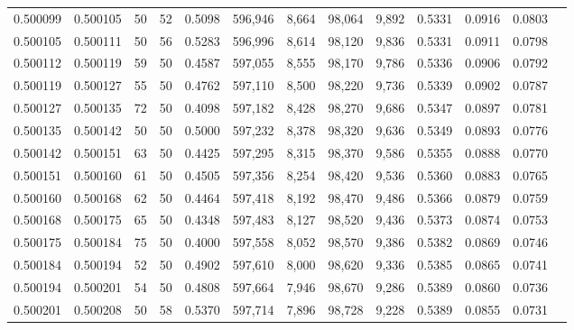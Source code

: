 \begin{tabular}{rrrrrrrrrrrrr}
0.500099 & 0.500105 &    50 &  52 &                                     0.5098 & 596,946 &   8,664 &  98,064 &   9,892 & 0.5331 & 0.0916 & 0.0803 \\
0.500105 & 0.500111 &    50 &  56 &                                     0.5283 & 596,996 &   8,614 &  98,120 &   9,836 & 0.5331 & 0.0911 & 0.0798 \\
0.500112 & 0.500119 &    59 &  50 &                                     0.4587 & 597,055 &   8,555 &  98,170 &   9,786 & 0.5336 & 0.0906 & 0.0792 \\
0.500119 & 0.500127 &    55 &  50 &                                     0.4762 & 597,110 &   8,500 &  98,220 &   9,736 & 0.5339 & 0.0902 & 0.0787 \\
0.500127 & 0.500135 &    72 &  50 &                                     0.4098 & 597,182 &   8,428 &  98,270 &   9,686 & 0.5347 & 0.0897 & 0.0781 \\
0.500135 & 0.500142 &    50 &  50 &                                     0.5000 & 597,232 &   8,378 &  98,320 &   9,636 & 0.5349 & 0.0893 & 0.0776 \\
0.500142 & 0.500151 &    63 &  50 &                                     0.4425 & 597,295 &   8,315 &  98,370 &   9,586 & 0.5355 & 0.0888 & 0.0770 \\
0.500151 & 0.500160 &    61 &  50 &                                     0.4505 & 597,356 &   8,254 &  98,420 &   9,536 & 0.5360 & 0.0883 & 0.0765 \\
0.500160 & 0.500168 &    62 &  50 &                                     0.4464 & 597,418 &   8,192 &  98,470 &   9,486 & 0.5366 & 0.0879 & 0.0759 \\
0.500168 & 0.500175 &    65 &  50 &                                     0.4348 & 597,483 &   8,127 &  98,520 &   9,436 & 0.5373 & 0.0874 & 0.0753 \\
0.500175 & 0.500184 &    75 &  50 &                                     0.4000 & 597,558 &   8,052 &  98,570 &   9,386 & 0.5382 & 0.0869 & 0.0746 \\
0.500184 & 0.500194 &    52 &  50 &                                     0.4902 & 597,610 &   8,000 &  98,620 &   9,336 & 0.5385 & 0.0865 & 0.0741 \\
0.500194 & 0.500201 &    54 &  50 &                                     0.4808 & 597,664 &   7,946 &  98,670 &   9,286 & 0.5389 & 0.0860 & 0.0736 \\
0.500201 & 0.500208 &    50 &  58 &                                     0.5370 & 597,714 &   7,896 &  98,728 &   9,228 & 0.5389 & 0.0855 & 0.0731 \\

\end{tabular}
